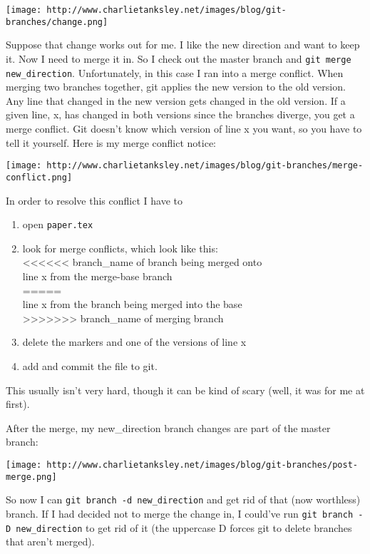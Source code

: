 \documentclass{article}
\begin{document}
\texttt{[image: http://www.charlietanksley.net/images/blog/git-branches/change.png]}

Suppose that change works out for me. I like the new direction and
want to keep it. Now I need to merge it in. So I check out the
master branch and \verb!git merge new_direction!. Unfortunately, in
this case I ran into a merge conflict. When merging two branches
together, git applies the new version to the old version. Any line
that changed in the new version gets changed in the old version. If
a given line, x, has changed in both versions since the branches
diverge, you get a merge conflict. Git doesn't know which version
of line x you want, so you have to tell it yourself. Here is my
merge conflict notice:

\texttt{[image: http://www.charlietanksley.net/images/blog/git-branches/merge-conflict.png]}

In order to resolve this conflict I have to

\begin{enumerate}
\item
  open \verb!paper.tex!
\item
  look for merge conflicts, which look like
  this:\\\textless{}\textless{}\textless{}\textless{}\textless{}\textless{}
  branch\_name of branch being merged onto\\line x from the
  merge-base branch\\=====\\line x from the branch being merged
  into the
  base\\\textgreater{}\textgreater{}\textgreater{}\textgreater{}\textgreater{}\textgreater{}\textgreater{}
  branch\_name of merging branch
\item
  delete the markers and one of the versions of line x
\item
  add and commit the file to git.
\end{enumerate}
This usually isn't very hard, though it can be kind of scary (well,
it was for me at first).

After the merge, my new\_direction branch changes are part of the
master branch:

\texttt{[image: http://www.charlietanksley.net/images/blog/git-branches/post-merge.png]}

So now I can \verb!git branch -d new_direction! and get rid of that
(now worthless) branch. If I had decided not to merge the change
in, I could've run \verb!git branch -D new_direction! to get rid of
it (the uppercase D forces git to delete branches that aren't
merged).
\end{document}
